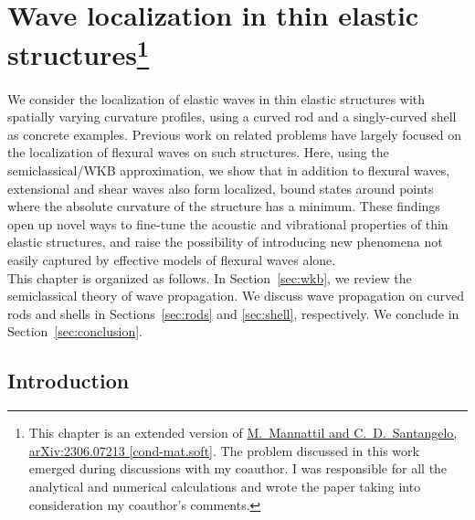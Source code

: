 
\chapter[Wave localization in thin elastic structures]{Wave localization in thin elastic structures\footnote{
  This chapter is an extended version of \href{https://arxiv.org/abs/2306.07213}{M.~Mannattil and C.~D.~Santangelo, arXiv:2306.07213 [cond-mat.soft]}.
  The problem discussed in this work emerged during discussions with my coauthor.
  I was responsible for all the analytical and numerical calculations and wrote the paper taking into consideration my coauthor's comments.
}}

We consider the localization of elastic waves in thin elastic structures with spatially varying curvature profiles, using a curved rod and a singly-curved shell as concrete examples.
Previous work on related problems have largely focused on the localization of flexural waves on such structures.
Here, using the semiclassical/WKB approximation, we show that in addition to flexural waves, extensional and shear waves also form localized, bound states around points where the absolute curvature of the structure has a minimum.
These findings open up novel ways to fine-tune the acoustic and vibrational properties of thin elastic structures, and raise the possibility of introducing new phenomena not easily captured by effective models of flexural waves alone.\\[-1em]

This chapter is organized as follows.
In Section~\ref{sec:wkb}, we review the semiclassical theory of wave propagation.
We discuss wave propagation on curved rods and shells in Sections~\ref{sec:rods} and \ref{sec:shell}, respectively.
We conclude in Section~\ref{sec:conclusion}.\\[-0.5em]

\section{Introduction}
\label{sec:introduction}


